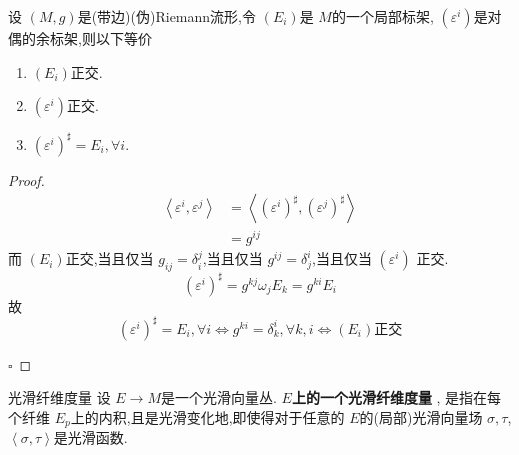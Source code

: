 \documentclass[../../几何与拓扑.tex]{subfiles}
\begin{document}
\begin{proposition}
    设 \(  \left( M,g \right)   \)是(带边)(伪)Riemann流形,令 \(  \left( E_{i} \right)   \)是 \(  M  \)的一个局部标架, \(  \left(  \varepsilon ^{i} \right)   \)是对偶的余标架,则以下等价
    \begin{enumerate}
        \item \(  \left( E_{i} \right)   \)正交.
        \item  \(  \left(  \varepsilon ^{i} \right)   \)正交.
        \item \(  \left(  \varepsilon ^{i} \right)^{\sharp }   = E_{i},\forall i\).   
    \end{enumerate}
        
\end{proposition}

\begin{proof}
    \[
    \begin{aligned}
    \left< \varepsilon ^{i}, \varepsilon ^{j} \right>& = \left<\left(  \varepsilon ^{i} \right)^{\sharp },\left(  \varepsilon ^{j} \right)^{\sharp }   \right> \\ 
     & = g^{ij}
    \end{aligned}
    \] 而 \(  \left( E_{i} \right)   \)正交,当且仅当 \(  g_{ij}=  \delta  _{i}^{j}  \),当且仅当 \(  g^{ij}=  \delta  _{j}^{i}  \),当且仅当 \(  \left(  \varepsilon ^{i} \right)   \)    正交. \[
    \left(  \varepsilon ^{i} \right)^{\sharp }= g^{kj} \omega _{j}E_{k}= g^{ki}E_{i}
    \]故 \[
    \left(  \varepsilon ^{i} \right)^{\sharp }= E_{i} ,\forall i \iff g^{ki}=   \delta  _{k}^{i},\forall k,i \iff \left( E_{i} \right)\text{正交} 
    \]

    \hfill $\square$
\end{proof}

\begin{definition}{光滑纤维度量}
    设 \(  E\to M  \)是一个光滑向量丛. \textbf{\(  E  \)上的一个光滑纤维度量 }, 是指在每个纤维 \(  E_{p}  \)上的内积,且是光滑变化地,即使得对于任意的 \(  E  \)的(局部)光滑向量场 \(   \sigma ,\tau   \),\(  \left< \sigma ,\tau  \right>  \)是光滑函数.    
\end{definition}
\end{document}
